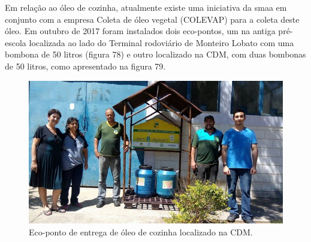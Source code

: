 \begin{description}
	
	
	Em relação ao óleo de cozinha, atualmente existe uma iniciativa da \gls{smaa} em conjunto com a empresa Coleta de óleo vegetal (COLEVAP) para a coleta deste óleo. Em outubro de 2017 foram instalados dois eco-pontos, um na antiga pré-escola localizada ao lado do Terminal rodoviário de Monteiro Lobato com uma bombona de 50 litros (figura 78) e outro localizado na CDM, com duas bombonas de 50 litros, como apresentado na figura 79.
	
	\begin{figure}
		\centering
		\includegraphics[width=0.75\linewidth]{produtos/prodtres/image094}
		\caption{Eco-ponto de entrega de óleo de cozinha localizado na CDM.}
		\label{fig:image094}
	\end{figure}
	

\end{description}
